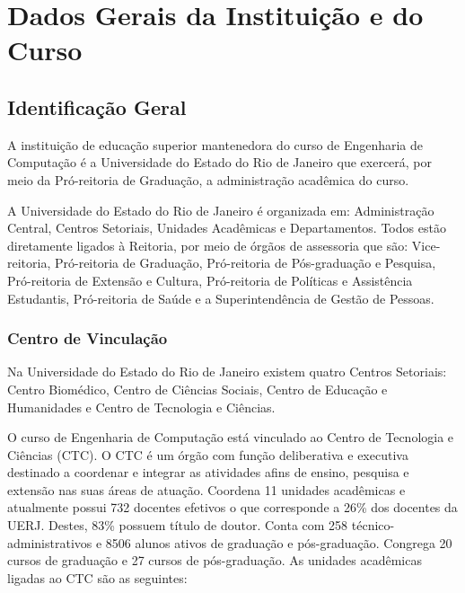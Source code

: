 \chapter{Dados Gerais da Instituição e do Curso}
\thispagestyle{plain}


\section{Identificação Geral}

A instituição de educação superior mantenedora do curso de Engenharia de Computação é a Universidade do Estado do Rio de Janeiro que exercerá, por meio da Pró-reitoria de Graduação, a administração acadêmica do curso.

A Universidade do Estado do Rio de Janeiro é organizada em: Administração Central, Centros Setoriais, Unidades Acadêmicas e Departamentos. Todos estão diretamente ligados à Reitoria, por meio de órgãos de assessoria que são: Vice-reitoria, Pró-reitoria de Graduação, Pró-reitoria de Pós-graduação e Pesquisa, Pró-reitoria de Extensão e Cultura, Pró-reitoria de Políticas e Assistência Estudantis, Pró-reitoria de Saúde e a Superintendência de Gestão de Pessoas.

\subsection{Centro de Vinculação}

Na Universidade do Estado do Rio de Janeiro existem quatro Centros Setoriais: Centro Biomédico, Centro de Ciências Sociais, Centro de Educação e Humanidades e Centro de Tecnologia e Ciências.

O curso de Engenharia de Computação está vinculado ao Centro de Tecnologia e Ciências (CTC).
O CTC é um órgão com função deliberativa e executiva destinado a coordenar e integrar as atividades afins de ensino, pesquisa e extensão nas suas áreas de atuação. Coordena 11 unidades acadêmicas e atualmente possui 732 docentes efetivos o que corresponde a 26\% dos docentes da UERJ. Destes, 83\% possuem título de doutor. Conta com 258 técnico-administrativos e 8506 alunos ativos de graduação e pós-graduação. Congrega 20 cursos de graduação e 27 cursos de pós-graduação. As unidades acadêmicas ligadas ao CTC são as seguintes:

